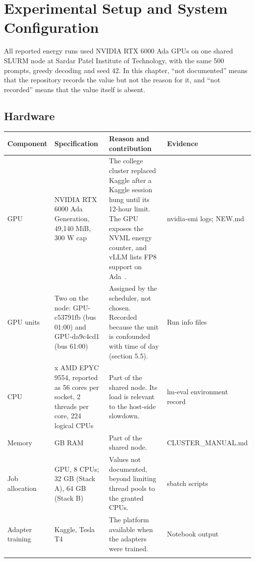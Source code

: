 \chapter{Experimental Setup and System Configuration}
All reported energy runs used NVIDIA RTX 6000 Ada GPUs on one shared SLURM node at Sardar Patel Institute of Technology, with the same 500 prompts, greedy decoding and seed 42. In this chapter, ``not documented'' means that the repository records the value but not the reason for it, and ``not recorded'' means that the value itself is absent.

\section{Hardware}

\begingroup\footnotesize\setlength{\tabcolsep}{4pt}
\begin{longtable}{>{\raggedright\arraybackslash}p{25.2mm}>{\raggedright\arraybackslash}p{39.8mm}>{\raggedright\arraybackslash}p{43.7mm}>{\raggedright\arraybackslash}p{30.1mm}}
\toprule
\textbf{Component} & \textbf{Specification} & \textbf{Reason and contribution} & \textbf{Evidence} \\
\midrule
\endhead
GPU & NVIDIA RTX 6000 Ada Generation, 49,140 MiB, 300 W cap & The college cluster replaced Kaggle after a Kaggle session hung until its 12-hour limit. The GPU exposes the NVML energy counter, and vLLM lists FP8 support on Ada~\cite{b45}. & nvidia-smi logs; NEW.md \\*
GPU units & Two on the node: GPU-c53791fb (bus 01:00) and GPU-da9c4cd1 (bus 61:00) & Assigned by the scheduler, not chosen. Recorded because the unit is confounded with time of day (section 5.5). & Run info files \\*
CPU & 2 x AMD EPYC 9554, reported as 56 cores per socket, 2 threads per core, 224 logical CPUs & Part of the shared node. Its load is relevant to the host-side slowdown. & lm-eval environment record \\*
Memory & 250 GB RAM & Part of the shared node. & CLUSTER\_\allowbreak{}MANUAL.md \\*
Job allocation & 1 GPU, 8 CPUs; 32 GB (Stack A), 64 GB (Stack B) & Values not documented, beyond limiting thread pools to the granted CPUs. & sbatch scripts \\*
Adapter training & Kaggle, Tesla T4 & The platform available when the adapters were trained. & Notebook output \\*
\bottomrule\noalign{\nobreak}
\end{longtable}
\addtocounter{table}{-1}
\endgroup

